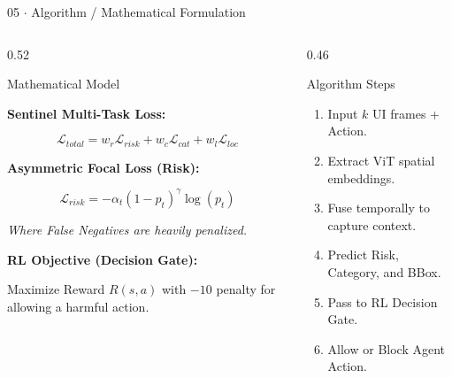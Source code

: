 \documentclass[aspectratio=169, 10pt]{beamer}
\begin{document}
\begin{frame}{05 $\cdot$ Algorithm / Mathematical Formulation}

    \begin{columns}[T]

        \begin{column}{0.52\textwidth}

            \begin{block}{Mathematical Model}

                \small

                \textbf{Sentinel Multi-Task Loss:}

                \[
                    \mathcal{L}_{total} = w_r \mathcal{L}_{risk} + w_c \mathcal{L}_{cat} + w_l \mathcal{L}_{loc}
                \]

                \textbf{Asymmetric Focal Loss (Risk):}

                \[
                    \mathcal{L}_{risk} = -\alpha_t (1 - p_t)^\gamma \log(p_t)
                \]

                \textit{Where False Negatives are heavily penalized.}

                \textbf{RL Objective (Decision Gate):}

                Maximize Reward $R(s, a)$ with $-10$ penalty for allowing a harmful action.

            \end{block}

        \end{column}

        \begin{column}{0.46\textwidth}

            \begin{block}{Algorithm Steps}

                \begin{enumerate}
                    \item Input $k$ UI frames + Action.
                    \item Extract ViT spatial embeddings.
                    \item Fuse temporally to capture context.
                    \item Predict Risk, Category, and BBox.
                    \item Pass to RL Decision Gate.
                    \item Allow or Block Agent Action.
                \end{enumerate}

            \end{block}

        \end{column}

    \end{columns}

\end{frame}
\end{document}
